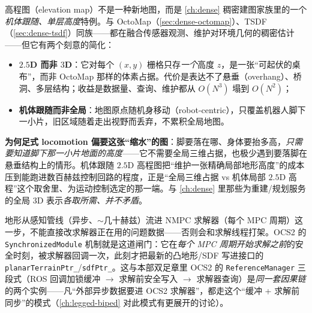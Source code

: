 \begin{insight}[高程图 = 随机体移动的 \texorpdfstring{$2.5$}{2.5}D 稠密建图]\label{ins:lp-elevation}
高程图（elevation map）不是一种新地图，而是 \cref{ch:dense} 稠密建图家族里的一个\emph{机体跟随、单层高度}特例。与 OctoMap（\cref{sec:dense-octomap}）、TSDF（\cref{sec:dense-tsdf}）同族——都在融合传感器观测、维护对环境几何的稠密估计——但它有两个刻意的简化：
\begin{itemize}
  \item \textbf{$2.5$D 而非 $3$D}：它对每个 $(x,y)$ 栅格只存\emph{一个}高度 $z$，是一张“可起伏的桌布”，而非 OctoMap 那样的体素占据。代价是表达不了悬垂（overhang）、桥洞、多层结构；收益是数据量、查询、维护都从 $O(N^3)$ 塌到 $O(N^2)$；
  \item \textbf{机体跟随而非全局}：地图原点随机身移动（robot-centric），只覆盖机器人脚下一小片，旧区域随着走出视野而丢弃，不累积全局地图。
\end{itemize}
\textbf{为何足式 locomotion 偏要这张“缩水”的图}：脚要落在哪、身体要抬多高，\emph{只需要知道脚下那一小片地面的高度}——它不需要全局三维占据，也极少遇到要落脚在悬垂结构上的情形。机体跟随 $2.5$D 高程图把“维护一张精确局部地形高度”的成本压到能跑进数百赫兹控制回路的程度，正是“全局三维占据 vs 机体局部 $2.5$D 高程”这个取舍里、为运动控制选定的那一端。与 \cref{ch:dense} 里那些为重建/规划服务的全局 $3$D 表示\emph{各取所需、并不矛盾}。
\end{insight}

\begin{insight}\label{ins:lp-sync}
地形从感知管线（异步、$\sim$几十赫兹）流进 NMPC 求解器（每个 MPC 周期）这一步，不能直接改求解器正在用的问题数据——否则会和求解线程打架。OCS2 的 \texttt{SynchronizedModule} 机制就是这道闸门：它在\emph{每个 MPC 周期开始求解之前}的安全时刻，被求解器回调一次，此刻才把最新的凸地形/SDF 写进接口的 \texttt{planarTerrainPtr\_}/\texttt{sdfPtr\_}。这与本部双足章里 OCS2 的 \texttt{ReferenceManager} 三段式（ROS 回调加锁缓冲 $\to$ 求解前安全写入 $\to$ 求解器查询）是\emph{同一套因果链}的两个实例——凡“外部异步数据要进 OCS2 求解器”，都走这个“缓冲 + 求解前同步”的模式（\cref{ch:legged-biped} 对此模式有更展开的讨论）。
\end{insight}

